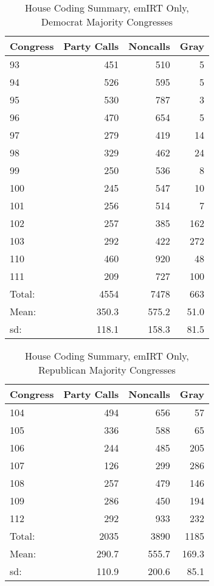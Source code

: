 \documentclass[12pt]{article}
\begin{document}
\begin{table}[ht]
	\caption{House Coding Summary, emIRT Only, Democrat Majority Congresses}
	\centering
	\begin{tabular}{lrrr}
		\hline
		Congress & Party Calls & Noncalls & Gray \\ 
		\hline
		93 & 451 & 510 &   5 \\ 
		94 & 526 & 595 &   5 \\ 
		95 & 530 & 787 &   3 \\ 
		96 & 470 & 654 &   5 \\ 
		97 & 279 & 419 &  14 \\ 
		98 & 329 & 462 &  24 \\ 
		99 & 250 & 536 &   8 \\ 
		100 & 245 & 547 &  10 \\ 
		101 & 256 & 514 &   7 \\ 
		102 & 257 & 385 & 162 \\ 
		103 & 292 & 422 & 272 \\ 
		110 & 460 & 920 &  48 \\ 
		111 & 209 & 727 & 100 \\ 
		\hline
		Total: & 4554 & 7478 & 663 \\
		Mean: & 350.3 & 575.2 & 51.0 \\
		sd: & 118.1 & 158.3 & 81.5 \\
		\hline
	\end{tabular}
\end{table}

\begin{table}[ht]
	\caption{House Coding Summary, emIRT Only, Republican Majority Congresses}
	\centering
	\begin{tabular}{lrrr}
		\hline
		Congress & Party Calls & Noncalls & Gray \\ 
		\hline
		104 & 494 & 656 &  57 \\ 
		105 & 336 & 588 &  65 \\ 
		106 & 244 & 485 & 205 \\ 
		107 & 126 & 299 & 286 \\ 
		108 & 257 & 479 & 146 \\ 
		109 & 286 & 450 & 194 \\ 
		112 & 292 & 933 & 232 \\ 
		\hline
		Total: & 2035 & 3890 & 1185 \\
		Mean: & 290.7 & 555.7 & 169.3 \\
		sd: & 110.9 & 200.6 & 85.1 \\
		\hline
	\end{tabular}
\end{table}
\end{document}
